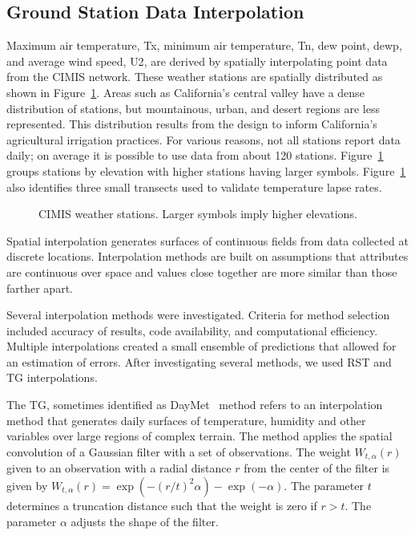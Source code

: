 \documentclass[reviewcopy]{elsart}
\begin{document}
\subsection{Ground Station Data Interpolation}
\label{sec:ground-stat-interp}

Maximum air temperature, \ac{Tx}, minimum air temperature, \ac{Tn},
dew point, \ac{dewp}, and average wind speed, \ac{U2}, are derived by
spatially interpolating point data from the \ac{CIMIS} network. These
weather stations are spatially distributed as shown in
Figure~\ref{fig:stations}.  Areas such as California's central valley
have a dense distribution of stations, but mountainous, urban, and
desert regions are less represented.  This distribution results from
the design to inform California's agricultural irrigation practices.
For various reasons, not all stations report data daily; on average it
is possible to use data from about 120 stations.
Figure~\ref{fig:stations} groups stations by elevation with higher
stations having larger symbols.  Figure~\ref{fig:stations} also
identifies three small transects used to validate temperature lapse
rates.

\begin{figure}[htbp]
  \centering
    \resizebox{.5\textwidth}{!}{}

    \caption{\ac{CIMIS} weather stations.  Larger symbols imply higher elevations.}
  \label{fig:stations}
\end{figure}

Spatial interpolation generates surfaces of continuous fields from
data collected at discrete locations. Interpolation methods are built
on assumptions that attributes are continuous over space and values
close together are more similar than those farther apart.

Several interpolation methods were investigated.  Criteria for method
selection included accuracy of results, code availability, and
computational efficiency.  Multiple interpolations created a small
ensemble of predictions that allowed for an estimation of errors.
After investigating several methods, we used \ac{RST} and \ac{TG}
interpolations.

The \ac{TG}, sometimes identified as
DayMet~\citep{thornton.ea:97:daymet} method refers to an interpolation
method that generates daily surfaces of temperature, humidity and
other variables over large regions of complex terrain.  The method
applies the spatial convolution of a Gaussian filter with a set of
observations.  The weight $W_{t,\alpha}(r)$ given to an observation
with a radial distance $r$ from the center of the filter is given by
$W_{t,\alpha}(r) = \exp(-(r/t)^2\alpha) - \exp(-\alpha)$.  The
parameter $t$ determines a truncation distance such that the weight is
zero if $r>t$. The parameter $\alpha$ adjusts the shape of the filter.
\end{document}
